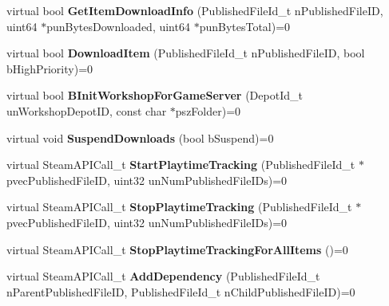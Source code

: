 \begin{DoxyCompactItemize}
\mbox{\label{class_i_steam_u_g_c_a0ef7718b82b39ff366f42900d0ab84c8}} 
virtual bool {\bfseries Get\+Item\+Download\+Info} (Published\+File\+Id\+\_\+t n\+Published\+File\+ID, uint64 $\ast$pun\+Bytes\+Downloaded, uint64 $\ast$pun\+Bytes\+Total)=0
\item 
\mbox{\label{class_i_steam_u_g_c_a462e4a1a9ae99b51eb2458fe4b5c415b}} 
virtual bool {\bfseries Download\+Item} (Published\+File\+Id\+\_\+t n\+Published\+File\+ID, bool b\+High\+Priority)=0
\item 
\mbox{\label{class_i_steam_u_g_c_af8beb048f7a3abe75382f8987465ba0b}} 
virtual bool {\bfseries B\+Init\+Workshop\+For\+Game\+Server} (Depot\+Id\+\_\+t un\+Workshop\+Depot\+ID, const char $\ast$psz\+Folder)=0
\item 
\mbox{\label{class_i_steam_u_g_c_a36dd71e7a78e0cd407ff03c219ce3669}} 
virtual void {\bfseries Suspend\+Downloads} (bool b\+Suspend)=0
\item 
\mbox{\label{class_i_steam_u_g_c_a700454e3c80e6b2f67d22bf83cb96d27}} 
virtual Steam\+A\+P\+I\+Call\+\_\+t {\bfseries Start\+Playtime\+Tracking} (Published\+File\+Id\+\_\+t $\ast$pvec\+Published\+File\+ID, uint32 un\+Num\+Published\+File\+I\+Ds)=0
\item 
\mbox{\label{class_i_steam_u_g_c_ad9f2721ce42e37864843223a7ff52cb1}} 
virtual Steam\+A\+P\+I\+Call\+\_\+t {\bfseries Stop\+Playtime\+Tracking} (Published\+File\+Id\+\_\+t $\ast$pvec\+Published\+File\+ID, uint32 un\+Num\+Published\+File\+I\+Ds)=0
\item 
\mbox{\label{class_i_steam_u_g_c_ad5a680171ed7ef44f524efaeff9dd57d}} 
virtual Steam\+A\+P\+I\+Call\+\_\+t {\bfseries Stop\+Playtime\+Tracking\+For\+All\+Items} ()=0
\item 
\mbox{\label{class_i_steam_u_g_c_a87ca47954fc399504f8680070a624807}} 
virtual Steam\+A\+P\+I\+Call\+\_\+t {\bfseries Add\+Dependency} (Published\+File\+Id\+\_\+t n\+Parent\+Published\+File\+ID, Published\+File\+Id\+\_\+t n\+Child\+Published\+File\+ID)=0
\item 
\mbox{\label{class_i_steam_u_g_c_a3f5b8fa293b7e1d02057e5020106155a}} 

\end{DoxyCompactItemize}
